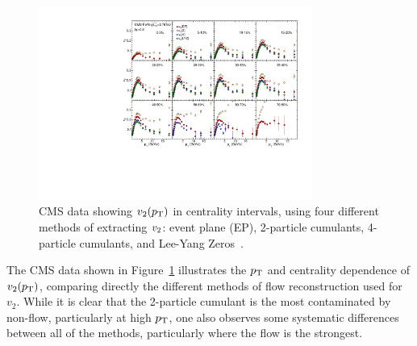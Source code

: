 \begin{figure}[!tb]
\begin{center}
\includegraphics[width=0.8\textwidth]{flowcorrelations_figs/v2_pt_12cen_4methods.pdf}
\caption[]{
CMS data showing $\mbox{$v_2$}(\mbox{$p_{\mathrm{T}}$})$ in centrality intervals, using four different methods of extracting
$\mbox{$v_2$}$: event plane (EP), 2-particle cumulants, 4-particle cumulants, and Lee-Yang Zeros~\cite{Chatrchyan:2012ta}.
}
\label{fig:pas:fc:methods}
\end{center}
\end{figure}

The CMS data shown in Figure~\ref{fig:pas:fc:methods} illustrates the $\mbox{$p_{\mathrm{T}}$}$ and centrality dependence of
$v_2(\mbox{$p_{\mathrm{T}}$})$, comparing directly the different methods of flow reconstruction used for $v_2$.
While it is clear that the 2-particle cumulant is the most contaminated by non-flow, particularly at high $\mbox{$p_{\mathrm{T}}$}$,
one also observes some systematic differences between all of the methods, particularly where the flow
is the strongest.

